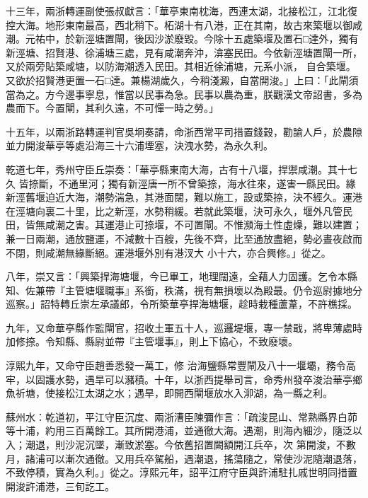 \begin{pinyinscope}
 十三年，兩浙轉運副使張叔獻言：「華亭東南枕海，西連太湖，北接松江，江北復控大海。地形東南最高，西北稍下。柘湖十有八港，正在其南，故古來築堰以御咸潮。元祐中，於新涇塘置閘，後因沙淤廢毀。今除十五處築堰及置石□達外，獨有新涇塘、招賢港、徐浦塘三處，見有咸潮奔沖，渰塞民田。今依新涇塘置閘一所，又於兩旁貼築咸塘，以防海潮透入民田。其相近徐浦塘，元系小派，
 自合築堰。又欲於招賢港更置一石□達。兼楊湖歲久，今稍淺澱，自當開浚。」上曰：「此閘須當為之。方今邊事寧息，惟當以民事為急。民事以農為重，朕觀漢文帝詔書，多為農而下。今置閘，其利久遠，不可憚一時之勞。」



 十五年，以兩浙路轉運判官吳坰奏請，命浙西常平司措置錢穀，勸諭人戶，於農隙並力開浚華亭等處沿海三十六浦堙塞，決洩水勢，為永久利。



 乾道七年，秀州守臣丘崇奏：「華亭縣東南大海，古有十八堰，捍禦咸潮。其十七久
 皆捺斷，不通里河；獨有新涇唐一所不曾築捺，海水往來，遂害一縣民田。緣新涇舊堰迫近大海，潮勢湍急，其港面闊，難以施工，設或築捺，決不經久。運港在涇塘向裏二十里，比之新涇，水勢稍緩。若就此築堰，決可永久，堰外凡管民田，皆無咸潮之害。其運港止可捺堰，不可置閘。不惟瀕海土性虛燥，難以建置；兼一日兩潮，通放鹽運，不減數十百艘，先後不齊，比至通放盡絕，勢必晝夜啟而不閉，則咸潮無緣斷絕。運港堰外別有港汊大
 小十六，亦合興修。」從之。



 八年，崇又言：「興築捍海塘堰，今已畢工，地理闊遠，全藉人力固護。乞令本縣知、佐兼帶『主管塘堰職事』系銜，秩滿，視有無損壞以為殿最。仍令巡尉據地分巡察。」詔特轉丘崇左承議郎，令所築華亭捍海塘堰，趁時栽種蘆葦，不許樵採。



 九年，又命華亭縣作監閘官，招收土軍五十人，巡邏堤堰，專一禁戢，將卑薄處時加修捺。令知縣、縣尉並帶『主管堰事』，則上下協心，不致廢壞。



 淳熙九年，又命守臣趙善悉發一萬工，修
 治海鹽縣常豐閘及八十一堰壩，務令高牢，以固護水勢，遇旱可以瀦積。十年，以浙西提舉司言，命秀州發卒浚治華亭鄉魚祈塘，使接松江太湖之水；遇旱，即開西閘堰放水入泖湖，為一縣之利。



 蘇州水：乾道初，平江守臣沉度、兩浙漕臣陳彌作言：「疏浚昆山、常熟縣界白茆等十浦，約用三百萬餘工。其所開港浦，並通徹大海。遇潮，則海內細沙，隨泛以入；潮退，則沙泥沉墜，漸致淤塞。今依舊招置闕額開江兵卒，次
 第開浚，不數月，諸浦可以漸次通徹。又用兵卒駕船，遇潮退，搖蕩隨之，常使沙泥隨潮退落，不致停積，實為久利。」從之。淳熙元年，詔平江府守臣與許浦駐扎戚世明同措置開浚許浦港，三旬訖工。




\end{pinyinscope}
